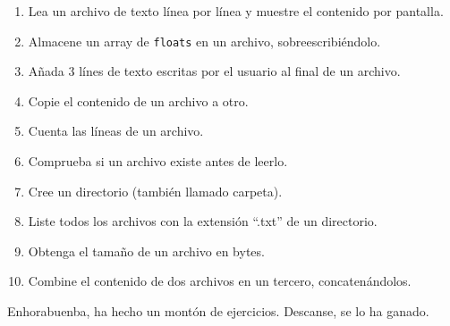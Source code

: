 \documentclass[a4paper]{article}
\newcommand{\code}[1]{\texttt{#1}}
\begin{document}
\begin{enumerate}
    \item Lea un archivo de texto línea por línea y muestre el contenido por pantalla.
    \item Almacene un array de \code{floats} en un archivo, sobreescribiéndolo.
    \item Añada 3 línes de texto escritas por el usuario al final de un archivo.
    \item Copie el contenido de un archivo a otro.
    \item Cuenta las líneas de un archivo.
    \item Comprueba si un archivo existe antes de leerlo.
    \item Cree un directorio (también llamado carpeta).
    \item Liste todos los archivos con la extensión ``.txt'' de un directorio.
    \item Obtenga el tamaño de un archivo en bytes.
    \item Combine el contenido de dos archivos en un tercero, concatenándolos.
\end{enumerate}

Enhorabuenba, ha hecho un montón de ejercicios. Descanse, se lo ha ganado.
\end{document}
